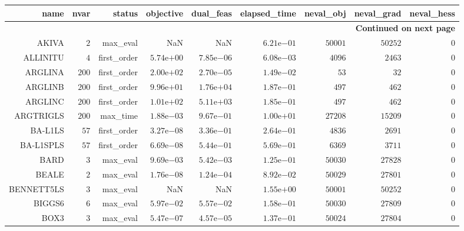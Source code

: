 \begin{longtable}{rrrrrrrrr}
\hline
name & nvar & status & objective & dual\_feas & elapsed\_time & neval\_obj & neval\_grad & neval\_hess \\\hline
\endhead
\hline
\multicolumn{9}{r}{{\bfseries Continued on next page}}\\
\hline
\endfoot
\endlastfoot
AKIVA & \(     2\) & max\_eval &       NaN &       NaN & \( 6.21\)e\(-01\) & \( 50001\) & \( 50252\) & \(     0\) \\
ALLINITU & \(     4\) & first\_order & \( 5.74\)e\(+00\) & \( 7.85\)e\(-06\) & \( 6.08\)e\(-03\) & \(  4096\) & \(  2463\) & \(     0\) \\
ARGLINA & \(   200\) & first\_order & \( 2.00\)e\(+02\) & \( 2.70\)e\(-05\) & \( 1.49\)e\(-02\) & \(    53\) & \(    32\) & \(     0\) \\
ARGLINB & \(   200\) & first\_order & \( 9.96\)e\(+01\) & \( 1.76\)e\(+04\) & \( 1.87\)e\(-01\) & \(   497\) & \(   462\) & \(     0\) \\
ARGLINC & \(   200\) & first\_order & \( 1.01\)e\(+02\) & \( 5.11\)e\(+03\) & \( 1.85\)e\(-01\) & \(   497\) & \(   462\) & \(     0\) \\
ARGTRIGLS & \(   200\) & max\_time & \( 1.88\)e\(-03\) & \( 9.67\)e\(-01\) & \( 1.00\)e\(+01\) & \( 27208\) & \( 15209\) & \(     0\) \\
BA-L1LS & \(    57\) & first\_order & \( 3.27\)e\(-08\) & \( 3.36\)e\(-01\) & \( 2.64\)e\(-01\) & \(  4836\) & \(  2691\) & \(     0\) \\
BA-L1SPLS & \(    57\) & first\_order & \( 6.69\)e\(-08\) & \( 5.44\)e\(-01\) & \( 5.69\)e\(-01\) & \(  6369\) & \(  3711\) & \(     0\) \\
BARD & \(     3\) & max\_eval & \( 9.69\)e\(-03\) & \( 5.42\)e\(-03\) & \( 1.25\)e\(-01\) & \( 50030\) & \( 27828\) & \(     0\) \\
BEALE & \(     2\) & max\_eval & \( 1.76\)e\(-08\) & \( 1.24\)e\(-04\) & \( 8.92\)e\(-02\) & \( 50029\) & \( 27801\) & \(     0\) \\
BENNETT5LS & \(     3\) & max\_eval &       NaN &       NaN & \( 1.55\)e\(+00\) & \( 50001\) & \( 50252\) & \(     0\) \\
BIGGS6 & \(     6\) & max\_eval & \( 5.97\)e\(-02\) & \( 5.57\)e\(-02\) & \( 1.58\)e\(-01\) & \( 50030\) & \( 27809\) & \(     0\) \\
BOX3 & \(     3\) & max\_eval & \( 5.47\)e\(-07\) & \( 4.57\)e\(-05\) & \( 1.37\)e\(-01\) & \( 50024\) & \( 27804\) & \(     0\) \\

\end{longtable}
